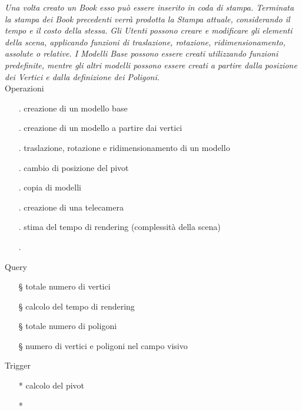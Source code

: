 \documentclass[a4paper,12pt]{report}
\begin{document}
{\it Una volta creato un Book esso può essere inserito in coda di stampa. Terminata la stampa dei Book precedenti verrà prodotta la Stampa attuale, considerando il tempo e il costo della stessa.}
{\it Gli Utenti possono creare e modificare gli elementi della scena, applicando funzioni di traslazione, rotazione, ridimensionamento, assolute o relative. I Modelli Base possono essere creati utilizzando funzioni predefinite, mentre gli altri modelli possono essere creati a partire dalla posizione dei Vertici e dalla definizione dei Poligoni.}\\
Operazioni
\begin{itemize}
	\item[.] creazione di un modello base
	\item[.] creazione di un modello a partire dai vertici
	\item[.] traslazione, rotazione e ridimensionamento di un modello
	\item[.] cambio di posizione del pivot
	\item[.] copia di modelli
	\item[.] creazione di una telecamera
	\item[.] stima del tempo di rendering (complessità della scena)
	\item[.]
\end{itemize}
Query
\begin{itemize}
	\item[§] totale numero di vertici
	\item[§] calcolo del tempo di rendering
	\item[§] totale numero di poligoni
	\item[§] numero di vertici e poligoni nel campo visivo
\end{itemize}
Trigger
\begin{itemize}
	\item[*] calcolo del pivot 
	\item[*] 
\end{itemize}
\end{document}
